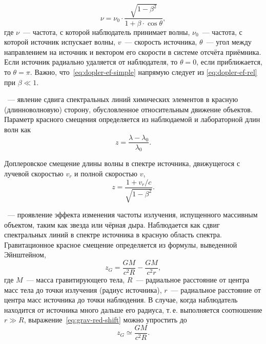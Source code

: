 \begin{equation}
\nu = \nu_0 \cdot \dfrac{\sqrt{1 - \beta^2}}{1 + \beta \cdot \cos\theta},
\label{eq:dopler-ef-rel}
\end{equation}
где $\nu$~--- частота, с которой наблюдатель принимает волны, $\nu_0$~--- частота, с которой источник испускает волны, $v$~--- скорость источника, $\theta$~--- угол между направлением на источник и вектором его скорости в системе отсчёта приёмника. Если источник радиально удаляется от наблюдателя, то $\theta = 0$, если приближается, то $\theta =\pi$. Важно, что~\eqref{eq:dopler-ef-simple} напрямую следует из \eqref{eq:dopler-ef-rel} при $\beta  \ll 1$.

~--- явление сдвига спектральных линий химических элементов в красную (длинноволновую) сторону, обусловленное относительным движение объектов. Параметр красного смещения определяется из наблюдаемой и лабораторной длин волн как
\begin{equation}
z = \dfrac{\lambda - \lambda_0}{\lambda_0}.
\end{equation}

Доплеровское смещение длины волны в спектре источника, движущегося с лучевой скоростью $v_{r}$ и полной скоростью $v$,
\begin{equation}
z = \dfrac{1 + v_r / c}{\sqrt{1 - \beta^2}}.
\end{equation}

~--- проявление эффекта изменения частоты излучения, испущенного массивным объектом, таким как звезда или чёрная дыра. Наблюдается как сдвиг спектральных линий в спектре источника в красную область спектра. Гравитационное красное смещение определяется из формулы, выведенной Эйнштейном,
\begin{equation}
z_G=\dfrac{GM}{c^2 R}-\dfrac{GM}{c^2 r},
\label{eq:grav-red-shift}
\end{equation}
где $M$~--- масса гравитирующего тела, $R$~--- радиальное расстояние от центра масс тела до точки излучения (радиус источника), $r$~---  радиальное расстояние от центра масс источника до точки наблюдения. В случае, когда наблюдатель находится от источника много дальше его радиуса, т.\,е. выполняется соотношение $r \gg R$, выражение~\eqref{eq:grav-red-shift} можно упростить до
\begin{equation}
z_G \simeq \dfrac{GM}{c^2 R}.
\end{equation}
